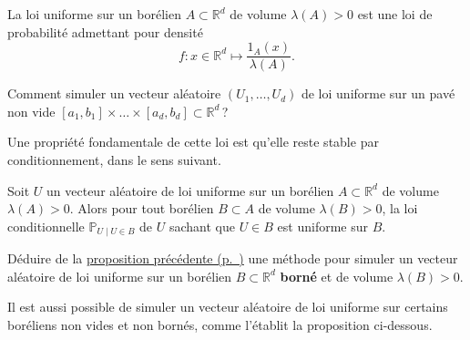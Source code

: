 \begin{definition}\label{V-loi-uniforme-sur-un-boruxe9lien}

La loi uniforme sur un borélien \(A\subset\mathbb{R}^d\) de volume
\(\lambda(A) > 0\) est une loi de probabilité admettant pour densité
\[f : x\in\mathbb{R}^d \mapsto \dfrac{1_A(x)}{\lambda(A)}.\]
\end{definition}

\label{V-unipave}
Comment simuler un vecteur aléatoire \((U_1,\dots,U_d)\) de loi uniforme
sur un pavé non vide
\([a_1,b_1]\times\dots\times[a_d,b_d] \subset \mathbb{R}^d\)\,?

Une propriété fondamentale de cette loi est qu'elle reste stable par
conditionnement, dans le sens suivant.

\begin{proposition}\label{V-stabunif}

Soit \(U\) un vecteur aléatoire de loi uniforme sur un borélien
\(A\subset\mathbb{R}^d\) de volume \(\lambda(A) > 0\). Alors pour tout
borélien \(B \subset A\) de volume \(\lambda(B) > 0\), la loi
conditionnelle \(\mathbb{P}_{U\mid U\in B}\) de \(U\) sachant que
\(U \in B\) est uniforme sur \(B\).
\end{proposition}

\label{V-unicond}

\label{V-simunibor}
Déduire de la \protect\hyperref[V-stabunif]{proposition
précédente (p.~\pageref*{V-stabunif})} une méthode pour simuler un
vecteur aléatoire de loi uniforme sur un borélien
\(B \subset \mathbb{R}^d\) \textbf{borné} et de volume
\(\lambda(B) > 0\).

Il est aussi possible de simuler un vecteur aléatoire de loi uniforme
sur certains boréliens non vides et non bornés, comme l'établit la
proposition ci-dessous.


